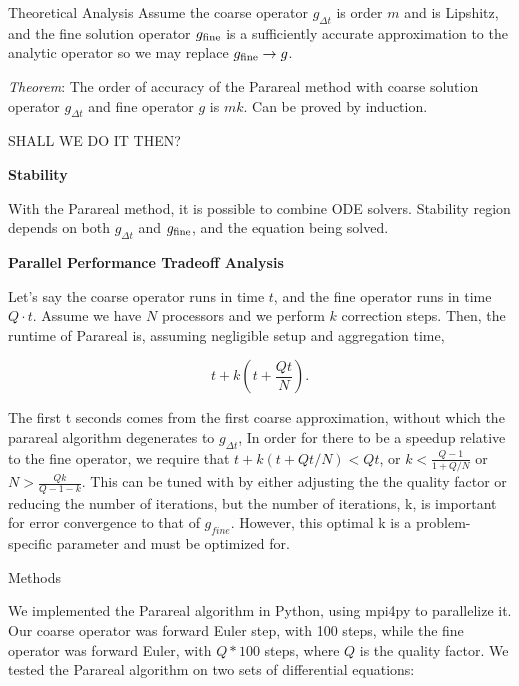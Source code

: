 \documentclass[final]{beamer}
\newlength{\onecolwid}
\begin{document}
\begin{frame}[t]
\begin{columns}[t]
\begin{column}{\onecolwid}
\begin{block}{Theoretical Analysis}
Assume the coarse operator $g_{\Delta t}$ is order $m$ and is Lipshitz, and the
fine solution operator $g_{\textnormal{fine}}$ is a sufficiently accurate
approximation to the analytic operator so we may replace $g_{\textnormal{fine}}
\to g$. 

\emph{Theorem}: The order of accuracy of the Parareal method with coarse
solution operator $g_{\Delta t}$ and fine operator $g$ is $mk$. Can be proved by
induction. 

SHALL WE DO IT THEN?

\textbf{Stability}

With the Parareal method, it is possible to combine ODE solvers. Stability
region depends on both $g_{\Delta t}$ and $g_{\textnormal{fine}}$, and the
equation being solved. 

\textbf{Parallel Performance Tradeoff Analysis}

Let's say the coarse operator runs in time $t$, and the fine operator runs in
time $Q \cdot t$. Assume we have $N$ processors and we perform $k$ correction
steps. Then, the runtime of Parareal is, assuming negligible setup and
aggregation time,

\begin{equation}
t + k(t + \frac{Qt}{N}).
\end{equation}

The first t seconds comes from the first coarse approximation, without which the parareal algorithm degenerates to $g_{\Delta t}$,  In order for there to be a speedup relative to the fine operator, we require
that $t + k(t + Qt/N) < Qt$, or $k < \frac{Q - 1}{1 + Q/N}$ or $N > \frac{Qk}{Q
- 1 - k}$. This can be tuned with by either adjusting the the quality factor or reducing the number of iterations, but the number of iterations, k, is important for error convergence to that of $g_{fine}$.  However, this optimal k is a problem-specific parameter and must be optimized for.

\end{block}


\begin{block}{Methods}

We implemented the Parareal algorithm in Python, using mpi4py to parallelize it.
Our coarse operator was forward Euler step, with 100 steps, while the fine
operator was forward Euler, with $Q * 100$ steps, where $Q$ is the quality
factor. We tested the Parareal algorithm on two sets of differential equations:


\end{block}
\end{column}
\end{columns}
\end{frame}
\end{document}
